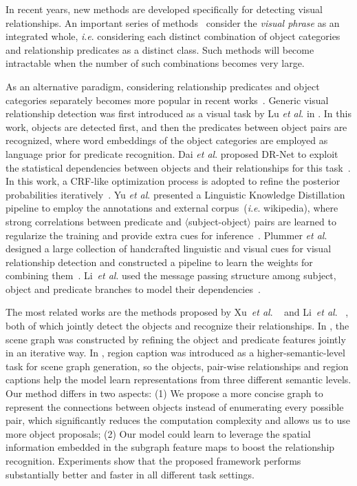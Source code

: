 \documentclass[runningheads]{llncs}
\newcommand{\etal}{\textit{et al}. }
\newcommand{\ie}{\textit{i}.\textit{e}. }
\begin{document}
In recent years, new methods are developed specifically for detecting visual relationships. 
An important series of methods~\cite{das2013thousand, divvala2014learning, sadeghi2011recognition}
consider the \emph{visual phrase} as an integrated whole, \ie considering each distinct combination of object categories and relationship predicates as
a distinct class. 
Such methods will become intractable when the number of such combinations becomes very large. 

As an alternative paradigm, considering relationship predicates and object categories separately becomes more popular in recent works~\cite{liao2017natural,peyre2017weakly,zhang2017visual,zhuang2017towards}. 
Generic visual relationship detection was first introduced as a visual task by Lu \etal in \cite{visual_relationship}. In this work, objects are detected first, and then the predicates between object pairs are recognized, where word embeddings of the object categories are employed as language prior for predicate recognition. 
Dai \etal proposed DR-Net to exploit the statistical dependencies between objects and their relationships for this task~\cite{dai2017detecting}. In this work, a CRF-like optimization process is adopted to refine the posterior probabilities iteratively~\cite{dai2017detecting}. 
Yu \etal presented a Linguistic Knowledge Distillation pipeline to employ the annotations and external corpus~(\ie wikipedia), where strong correlations between predicate and $\langle$subject-object$\rangle$ pairs are learned to regularize the training and provide extra cues for inference~\cite{yu2017visual}. 
Plummer \etal designed a large collection of handcrafted linguistic and visual cues for visual relationship detection and constructed a pipeline to learn the weights for combining them~\cite{plummer2016phrase}.
Li~\etal used the message passing structure among subject, object and predicate branches to model their dependencies~\cite{li2017vip}. 

The most related works are the methods proposed by Xu~\etal~\cite{xu2017scene} and Li~\etal~\cite{li2017scene}, both of which jointly detect the objects and recognize their relationships.  
In \cite{xu2017scene}, the scene graph was constructed by refining the object and predicate features jointly in an iterative way. In \cite{li2017scene}, region caption was introduced as a higher-semantic-level task for scene graph generation, so the objects, pair-wise relationships and region captions help the model learn representations from three different semantic levels. 
Our method differs in two aspects:
(1) We propose a more concise graph to represent the connections between objects instead of enumerating every possible pair, which significantly reduces the computation complexity and allows us to use more object proposals; 
(2) Our model could learn to leverage the spatial information embedded in the subgraph feature maps to boost the relationship recognition.  
Experiments show that the proposed framework performs substantially better and faster in 
all different task settings. 
\end{document}
